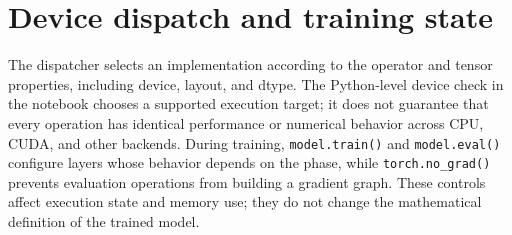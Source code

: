 \documentclass[../../labs.tex]{subfiles}
\begin{document}
\section{Device dispatch and training state}

The dispatcher selects an implementation according to the operator and tensor properties, including device, layout, and dtype. The Python-level device check in the notebook chooses a supported execution target; it does not guarantee that every operation has identical performance or numerical behavior across CPU, CUDA, and other backends. During training, \texttt{model.train()} and \texttt{model.eval()} configure layers whose behavior depends on the phase, while \texttt{torch.no\_grad()} prevents evaluation operations from building a gradient graph. These controls affect execution state and memory use; they do not change the mathematical definition of the trained model.
\end{document}
